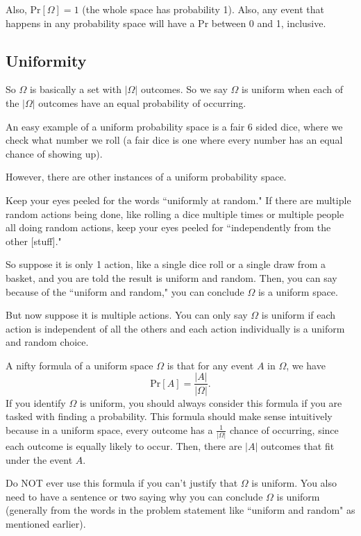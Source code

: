 \documentclass[11pt]{scrartcl}
\begin{document}
Also, $\text{Pr}[\Omega] = 1$ (the whole space has probability 1). Also, any event that happens in any probability space will have a Pr between 0 and 1, inclusive.

\subsection{Uniformity}

So $\Omega$ is basically a set with $|\Omega|$ outcomes. So we say $\Omega$ is uniform when each of the $|\Omega|$ outcomes have an equal probability of occurring.

An easy example of a uniform probability space is a fair 6 sided dice, where we check what number we roll (a fair dice is one where every number has an equal chance of showing up).

However, there are other instances of a uniform probability space.

\begin{advice}
Keep your eyes peeled for the words ``uniformly at random." If there are multiple random actions being done, like rolling a dice multiple times or multiple people all doing random actions, keep your eyes peeled for ``independently from the other [stuff]."
\end{advice}

So suppose it is only 1 action, like a single dice roll or a single draw from a basket, and you are told the result is uniform and random. Then, you can say because of the ``uniform and random," you can conclude $\Omega$ is a uniform space.

But now suppose it is multiple actions. You can only say $\Omega$ is uniform if each action is independent of all the others and each action individually is a uniform and random choice.

A nifty formula of a uniform space $\Omega$ is that for any event $A$ in $\Omega$, we have \[\text{Pr}[A] = \frac{|A|}{|\Omega|}.\] If you identify $\Omega$ is uniform, you should always consider this formula if you are tasked with finding a probability. This formula should make sense intuitively because in a uniform space, every outcome has a $\frac{1}{|\Omega|}$ chance of occurring, since each outcome is equally likely to occur. Then, there are $|A|$ outcomes that fit under the event $A$.

\begin{caveat}
    Do NOT ever use this formula if you can't justify that $\Omega$ is uniform. You also need to have a sentence or two saying why you can conclude $\Omega$ is uniform (generally from the words in the problem statement like ``uniform and random" as mentioned earlier).
\end{caveat}
\end{document}
